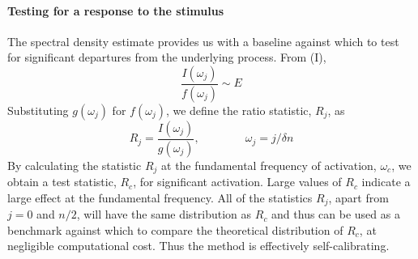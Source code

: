 \documentclass[a0,portrait]{a0poster}
\begin{document}
\begin{center}
{\paragraph{Testing for a response to the stimulus}

The spectral density estimate provides us with a baseline against
which to test for significant departures from the underlying process.
From (I),
\begin{equation}
  \frac{I(\omega_j)}{f(\omega_j)} \sim E
\label{eq:13}
\end{equation}
Substituting $g(\omega_j)$ for $f(\omega_j)$, we define the ratio
statistic, $R_j$, as
\begin{equation}
  R_j = \frac{I(\omega_j)}{g(\omega_j)},\qquad\qquad \omega_j=j/\delta
  n
\label{eq:14}
\end{equation}
By calculating the statistic $R_j$ at the fundamental frequency of
activation, $\omega_c$, we obtain a test statistic, $R_c$, for
significant activation. Large values of $R_c$ indicate a large effect at the fundamental
frequency. All of the statistics $R_j$, apart from $j=0$ and $n/2$, will have the same distribution as $R_c$ and thus can be used as a benchmark against which to compare the theoretical distribution of $R_c$, at negligible computational cost. Thus the method is effectively self-calibrating.

}
\end{center}
\end{document}
